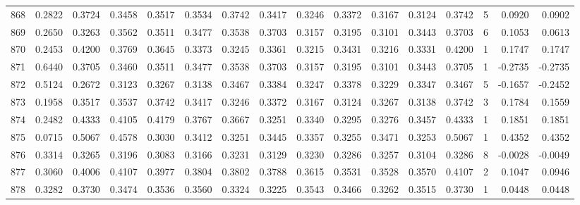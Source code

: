 \begin{tabular}{lrrrrrrrrrrrrrrr}
868 &      0.2822 &  0.3724 &  0.3458 &  0.3517 &  0.3534 &  0.3742 &  0.3417 &  0.3246 &  0.3372 &  0.3167 &   0.3124 &     0.3742 &      5 &                    0.0920 &                     0.0902 \\
869 &      0.2650 &  0.3263 &  0.3562 &  0.3511 &  0.3477 &  0.3538 &  0.3703 &  0.3157 &  0.3195 &  0.3101 &   0.3443 &     0.3703 &      6 &                    0.1053 &                     0.0613 \\
870 &      0.2453 &  0.4200 &  0.3769 &  0.3645 &  0.3373 &  0.3245 &  0.3361 &  0.3215 &  0.3431 &  0.3216 &   0.3331 &     0.4200 &      1 &                    0.1747 &                     0.1747 \\
871 &      0.6440 &  0.3705 &  0.3460 &  0.3511 &  0.3477 &  0.3538 &  0.3703 &  0.3157 &  0.3195 &  0.3101 &   0.3443 &     0.3705 &      1 &                   -0.2735 &                    -0.2735 \\
872 &      0.5124 &  0.2672 &  0.3123 &  0.3267 &  0.3138 &  0.3467 &  0.3384 &  0.3247 &  0.3378 &  0.3229 &   0.3347 &     0.3467 &      5 &                   -0.1657 &                    -0.2452 \\
873 &      0.1958 &  0.3517 &  0.3537 &  0.3742 &  0.3417 &  0.3246 &  0.3372 &  0.3167 &  0.3124 &  0.3267 &   0.3138 &     0.3742 &      3 &                    0.1784 &                     0.1559 \\
874 &      0.2482 &  0.4333 &  0.4105 &  0.4179 &  0.3767 &  0.3667 &  0.3251 &  0.3340 &  0.3295 &  0.3276 &   0.3457 &     0.4333 &      1 &                    0.1851 &                     0.1851 \\
875 &      0.0715 &  0.5067 &  0.4578 &  0.3030 &  0.3412 &  0.3251 &  0.3445 &  0.3357 &  0.3255 &  0.3471 &   0.3253 &     0.5067 &      1 &                    0.4352 &                     0.4352 \\
876 &      0.3314 &  0.3265 &  0.3196 &  0.3083 &  0.3166 &  0.3231 &  0.3129 &  0.3230 &  0.3286 &  0.3257 &   0.3104 &     0.3286 &      8 &                   -0.0028 &                    -0.0049 \\
877 &      0.3060 &  0.4006 &  0.4107 &  0.3977 &  0.3804 &  0.3802 &  0.3788 &  0.3615 &  0.3531 &  0.3528 &   0.3570 &     0.4107 &      2 &                    0.1047 &                     0.0946 \\
878 &      0.3282 &  0.3730 &  0.3474 &  0.3536 &  0.3560 &  0.3324 &  0.3225 &  0.3543 &  0.3466 &  0.3262 &   0.3515 &     0.3730 &      1 &                    0.0448 &                     0.0448 \\

\end{tabular}
